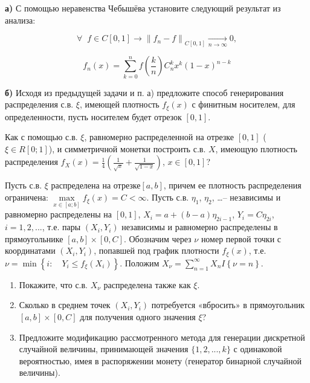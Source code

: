 \begin{problem} 

\textbf{а)} С помощью неравенства Чебышёва установите следующий результат из анализа: 

\[
\forall \; \; f\in C\left[0,1\right]\to \left\| f_{n} -f\right\| _{C\left[0,1\right]} \xrightarrow[{n\to \infty }]{} 0,
\] 

\[
f_{n} \left(x\right)=\sum_{k=0}^{n}f\left(\frac{k}{n} \right) C_{n}^{k} x^{k} \left(1-x\right)^{n-k} 
\]

\textbf{б)} Исходя из предыдущей задачи и п. а) предложите способ генерирования распределения с.в. $\xi $, имеющей плотность $f_{\xi } \left(x\right)$ с финитным носителем, для определенности, пусть носителем будет отрезок $\left[0,1\right]$.
\end{problem}

\begin{problem}
Как с помощью с.в. $\xi $, равномерно распределенной на отрезке $\left[0,1\right]$ ($\xi \in R\left[0;1\right]$), и симметричной монетки построить с.в. $X$, имеющую плотность распределения $f_{X} (x)=\frac{1}{4} \left(\frac{1}{\sqrt{x} } +\frac{1}{\sqrt{1-x} } \right)$, $x\in \left[0,1\right]$?
\end{problem}

\begin{problem} 

Пусть с.в. $\xi $ распределена на отрезке$\left[a,b\right]$, причем ее плотность распределения ограничена: $\mathop{\max }\limits_{x\in \left[a;b\right]} f_{\xi } (x)=C<\infty $. Пусть с.в. $\eta _{1} $, $\eta _{2} $, \dots  -- независимы и равномерно распределены на $\left[0,1\right]$, $X_{i} =a+\left(b-a\right)\eta _{2i-1} $, $Y_{i} =C\eta _{2i} $, $i=1,2,...$, т.е. пары $\left(X_{i} ,Y_{i} \right)$ независимы и равномерно распределены в прямоугольнике $\left[a,b\right]\times \left[0,C\right]$. Обозначим через $\nu $ номер первой точки с координатами $\left(X_{i} ,Y_{i} \right)$, попавшей под график плотности $f_{\xi } (x)$, т.е. $\nu =\min \left\{i:\quad Y_{i} \le f_{\xi } (X_{i} )\right\}$. Положим $X_{\nu } =\sum _{n=1}^{\infty }X_{n} I\left\{\nu =n\right\} $.

\begin{enumerate}
\item Покажите, что с.в. $X_{\nu } $ распределена также как $\xi $.

\item Сколько в среднем точек $\left(X_{i} ,Y_{i} \right)$ потребуется «вбросить» в прямоугольник $\left[a,b\right]\times \left[0,C\right]$ для получения одного значения $\xi $?

\item Предложите модификацию рассмотренного метода для генерации дискретной случайной величины, принимающей значения $\lbrace 1, 2, ... , k \rbrace$ с одинаковой вероятностью, имея в распоряжении монету (генератор бинарной случайной величины).   
\end{enumerate}
\end{problem}

